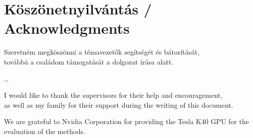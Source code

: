\documentclass[12pt]{report}
\begin{document}
\vspace*{4cm}

\chapter*{Köszönetnyilvántás / Acknowledgments}

\begin{center}
	Szeretném megköszönni a témavezetők segítségét és bátorítását,\\
	továbbá a családom támogatását a dolgozat írása alatt.
\end{center}
\begin{center}
	\dots
\end{center}
\begin{center}
	I would like to thank the supervisors for their help and encouragement,\\
	as well as my family for their support during the writing of this document.
\end{center}
\begin{center}
	We are grateful to Nvidia Corporation for providing the Tesla K40 GPU for the evaluation of the methods.
\end{center}
 

\end{document}
